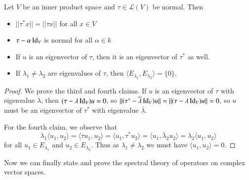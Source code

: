 \begin{theorem}
    Let $V$ be an inner product space and $\tau \in \mathcal{L}(V)$ be normal. Then \begin{itemize}
        \item $||\tau^*x|| = ||\tau x||$ for all $x \in V$
        \item $\tau-\alpha \operatorname{Id}_V$ is normal for all $\alpha \in k$
        \item If $u$ is an eigenvector of $\tau$, then it is an eigenvector of $\tau^*$ as well.
        \item If $\lambda_1\neq \lambda_2$ are eigenvalues of $\tau$, then $\langle E_{\lambda_1},E_{\lambda_2}\rangle = \{0\}$.
    \end{itemize}
\end{theorem}
\begin{proof}
    We prove the third and fourth claims. If $u$ is an eigenvector of $\tau$ with eigenvalue $\lambda$, then $(\tau-\lambda \operatorname{Id}_V)u =0$, so $||(\tau^*-\overline{\lambda}\operatorname{Id}_V)u|| = ||(\tau-\lambda \operatorname{Id}_V)u|| = 0$, so $u$ must be an eigenvector of $\tau^*$ with eigenvalue $\overline{\lambda}$.

    For the fourth claim, we observe that \begin{equation*}
        \lambda_1\langle u_1,u_2\rangle = \langle \tau u_1,u_2\rangle = \langle u_1,\tau^*u_2\rangle = \langle u_1,\overline{\lambda}_2u_2\rangle = \lambda_2\langle u_1,u_2\rangle
    \end{equation*}
    for all $u_1 \in E_{\lambda_1}$ and $u_2 \in E_{\lambda_2}$. Thus as $\lambda_1\neq \lambda_2$ we must have $\langle u_1,u_2\rangle = 0$.
\end{proof}

Now we can finally state and prove the spectral theory of operators on complex vector spaces.

